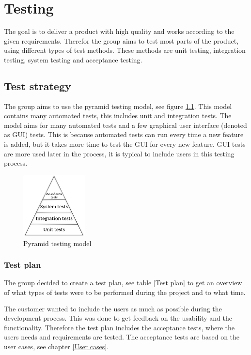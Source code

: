 
\chapter{Testing}
The goal is to deliver a product with high quality and works according to the given requirements. Therefor the group aims to test most parts of the product, using different types of test methods. These methods are unit testing, integration testing, system testing and acceptance testing.


\section{Test strategy}
The group aims to use the pyramid testing model, see figure \ref{pyramid testing model}. This model contains many automated tests, this includes unit and integration tests. The model aims for many automated tests and a few graphical user interface (denoted as GUI) tests. This is because automated tests can run every time a new feature is added, but it takes more time to test the GUI for every new feature. GUI tests are more used later in the process, it is typical to include users in this testing process.

\begin{figure}[!ht]
    \centering
        \includegraphics[width=0.3\textwidth]{fig/testpyramid}
    \caption{Pyramid testing model}
    \label{pyramid testing model}
 \end{figure}

\subsection{Test plan}
The group decided to create a test plan, see table \ref{Test plan}  to get an overview of what types of tests were to be performed during the project and to what time.

The customer wanted to include the users as much as possible during the development process. This was done to get feedback on the usability and the functionality. Therefore the test plan includes the acceptance tests, where the users needs and requirements are tested. The acceptance tests are based on the user cases, see chapter \ref{User cases}.

